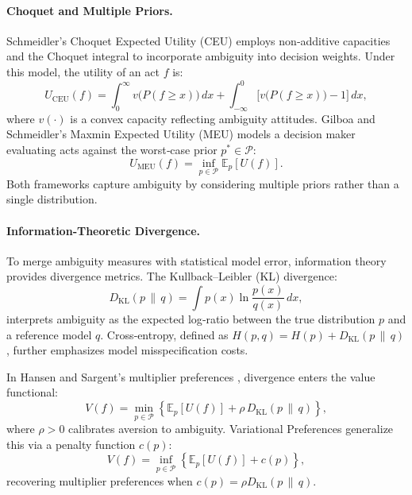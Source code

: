 \documentclass[preprint,12pt,authoryear]{elsarticle}
\begin{document}
\paragraph{Choquet and Multiple Priors.} Schmeidler's Choquet Expected Utility (CEU) \cite{schmeidler1989} employs non‑additive capacities and the Choquet integral to incorporate ambiguity into decision weights. Under this model, the utility of an act $f$ is:
\begin{equation}
U_{\mathrm{CEU}}(f)=\int_0^\infty v\bigl(P(f\ge x)\bigr)\,dx + \int_{-\infty}^0 \bigl[v\bigl(P(f\ge x)\bigr)-1\bigr]\,dx,
\end{equation}
where $v(\cdot)$ is a convex capacity reflecting ambiguity attitudes. Gilboa and Schmeidler's Maxmin Expected Utility (MEU) \cite{gilboa1989} models a decision maker evaluating acts against the worst‑case prior $p^*\in\mathcal{P}$:
\begin{equation}
U_{\mathrm{MEU}}(f)=\inf_{p\in\mathcal{P}}\mathbb{E}_p[U(f)].
\end{equation}
Both frameworks capture ambiguity by considering multiple priors rather than a single distribution.

\paragraph{Information‑Theoretic Divergence.} To merge ambiguity measures with statistical model error, information theory provides divergence metrics. The Kullback–Leibler (KL) divergence:
\begin{equation}
D_{\mathrm{KL}}(p\,\|\,q)=\int p(x)\ln\frac{p(x)}{q(x)}\,dx,
\end{equation}
interprets ambiguity as the expected log‑ratio between the true distribution $p$ and a reference model $q$. Cross‑entropy, defined as $H(p,q)=H(p)+D_{\mathrm{KL}}(p\,\|\,q)$, further emphasizes model misspecification costs.

In Hansen and Sargent's multiplier preferences \cite{hansen2001}, divergence enters the value functional:
\begin{equation}
V(f)=\min_{p\in\mathcal{P}}\left\{\mathbb{E}_p[U(f)] + \rho\,D_{\mathrm{KL}}(p\,\|\,q)\right\},
\end{equation}
where $\rho>0$ calibrates aversion to ambiguity. Variational Preferences \cite{maccheroni2006} generalize this via a penalty function $c(p)$:
\begin{equation}
V(f)=\inf_{p\in\mathcal{P}}\left\{\mathbb{E}_p[U(f)] + c(p)\right\},
\end{equation}
recovering multiplier preferences when $c(p)=\rho D_{\mathrm{KL}}(p\,\|\,q)$.
\end{document}
